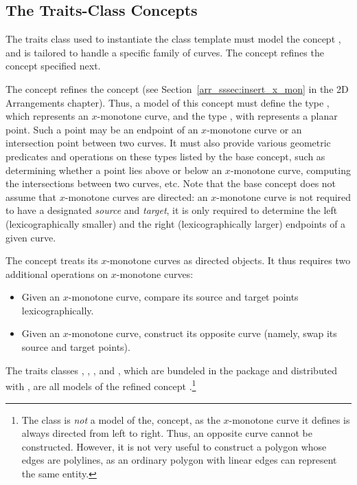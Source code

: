 \subsection{The Traits-Class Concepts}
\label{bops_ssec:traits_concepts}

The traits class used to instantiate the 
class template must model the concept ,
and is tailored to handle a specific family of curves. The concept
 refines the concept
 specified next.

The concept  refines the 
concept  (see 
Section~\ref{arr_sssec:insert_x_mon} in the 2D Arrangements chapter).
Thus, a model of this concept must define the type , 
which represents an $x$-monotone curve, and the type , 
with represents a planar point. Such a point may be an endpoint of an
$x$-monotone curve or an intersection point between two curves.
It must also provide various geometric predicates and operations 
on these types listed by the base concept, such as determining whether
a point lies above or below an $x$-monotone curve, computing the
intersections between two curves, etc. Note that the base concept does
not assume that $x$-monotone curves are directed: an $x$-monotone
curve is not required to have a designated {\em source} and {\em
target}, it is only required to determine the left (lexicographically
smaller) and the right (lexicographically larger) endpoints of a given
curve.

The  concept treats its
$x$-monotone curves as directed objects. It thus requires two additional
operations on $x$-monotone curves:
\begin{itemize}
\item Given an $x$-monotone curve, compare its source and target points
lexicographically.
\item Given an $x$-monotone curve, construct its opposite curve (namely,
swap its source and target points).
\end{itemize}

The traits classes , 
, ,
 and , which are 
bundeled in the  package and distributed with \cgal,
are all models of the refined concept 
.\footnote{The
 class is {\em not} a model of the, 
 concept, as the
$x$-monotone curve it defines is always directed from left to
right. Thus, an opposite curve cannot be constructed. However, it is
not very useful to construct a polygon whose edges are polylines, as
an ordinary polygon with linear edges can represent the same entity.}

